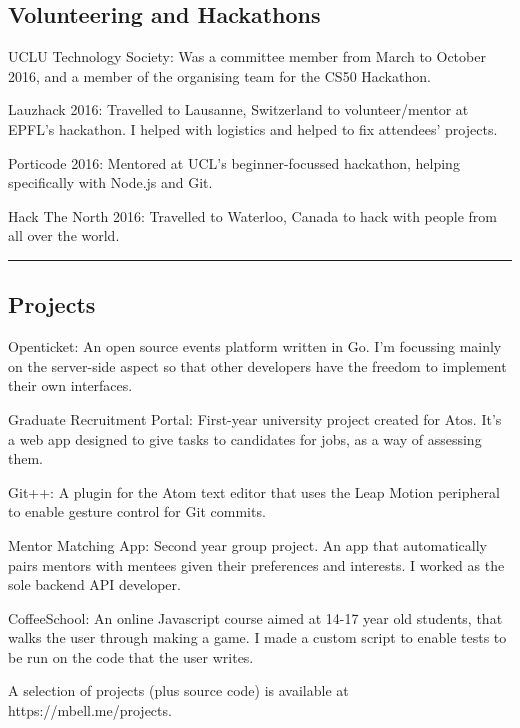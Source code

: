 \documentclass[11pt,a4paper]{article}
\newenvironment{indentsection}[1]%
{\begin{list}{}%
	{\setlength{\leftmargin}{#1}}%
	\item[]%
}
{\end{list}}
\begin{document}
\subsection*{Volunteering and Hackathons}
\begin{indentsection}{\parindent}
\begin{description*}
	\item[UCLU Technology Society:] Was a committee member from March to October 2016, and a member of the organising team for the CS50 Hackathon.
	\item[Lauzhack 2016:] Travelled to Lausanne, Switzerland to volunteer/mentor at EPFL's hackathon. I helped with logistics and helped to fix attendees' projects.
	\item[Porticode 2016:] Mentored at UCL's beginner-focussed hackathon, helping specifically with Node.js and Git.
	\item[Hack The North 2016:] Travelled to Waterloo, Canada to hack with people from all over the world.
\end{description*}
\end{indentsection}
\vspace{-0.4em}
\hrule

\vspace{-1.2em}
\subsection*{Projects}
\begin{indentsection}{\parindent}
	\begin{description*}
		\item[Openticket:]
		An open source events platform written in Go. I'm focussing mainly on the server-side aspect so that other developers have the freedom to implement their own interfaces.
		\item[Graduate Recruitment Portal:]
		First-year university project created for Atos. It's a web app designed to give tasks to candidates for jobs, as a way of assessing them.
		\item[Git++:]
		A plugin for the Atom text editor that uses the Leap Motion peripheral to enable gesture control for Git commits.
		\item[Mentor Matching App:]
		Second year group project. An app that automatically pairs mentors with mentees given their preferences and interests. I worked as the sole backend API developer.
		\item[CoffeeSchool:]
		An online Javascript course aimed at 14-17 year old students, that walks the user through making a game. I made a custom script to enable tests to be run on the code that the user writes.
	\end{description*}
	A selection of projects (plus source code) is available at https://mbell.me/projects.
\end{indentsection}
\end{document}
